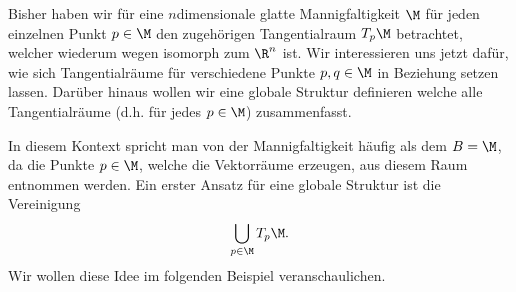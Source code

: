 \documentclass[letterpaper,10pt,german]{jupyterBook}
\begin{document}
\sphinxAtStartPar
Bisher haben wir für eine \(n\)\sphinxhyphen{}dimensionale glatte Mannigfaltigkeit \(\M\) für jeden einzelnen Punkt \(p\in\M\) den zugehörigen Tangentialraum \(T_p\M\) betrachtet, welcher wiederum wegen {\hyperref[\detokenize{manifolds/tangential:thm:tanbasis}]{}} isomorph zum \(\R^n\) ist.
Wir interessieren uns jetzt dafür, wie sich Tangentialräume für verschiedene Punkte \(p,q\in \M\) in Beziehung setzen lassen.
Darüber hinaus wollen wir eine globale Struktur definieren welche alle Tangentialräume (d.h. für jedes \(p\in\M\)) zusammenfasst.

\sphinxAtStartPar
In diesem Kontext spricht man von der Mannigfaltigkeit häufig als dem  \(B=\M\), da die Punkte \(p \in \M\), welche die Vektorräume erzeugen, aus diesem Raum entnommen werden.
Ein erster Ansatz für eine globale Struktur ist die Vereinigung
\begin{equation*}
\begin{split}\bigcup_{p\in\M} T_p\M.\end{split}
\end{equation*}
\sphinxAtStartPar
Wir wollen diese Idee im folgenden Beispiel veranschaulichen.
\label{manifolds/tangential:ex:tangentialS1}
\end{document}
